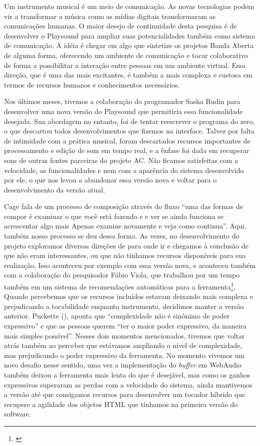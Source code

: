 Um instrumento musical é um meio de comunicação. As novas tecnologias podem vir a transformar a música como as mídias digitais transformaram as comunicações humanas. O maior desejo de continuidade desta pesquisa é de desenvolver o Playsound para ampliar suas potencialidades também como sistema de comunicação. A idéia é chegar em algo que sintetize os projetos Banda Aberta de alguma forma, oferecendo um ambiente de comunicação e tocar colaborativo de forma a possibilitar a interação entre pessoas em um ambiente virtual. Essa direção, que é uma das mais excitantes, é também a mais complexa e custosa em termos de recursos humanos e conhecimentos necessários.

Nos últimos meses, tivemos a colaboração do programador Sasha Rudin para desenvolver uma nova versão do Playsound que permitiria essa funcionalidade desejada. Sua abordagem no entanto, foi de tentar reescrever o programa do zero, o que descartou todos desenvolvimentos que fizemos na interface. Talvez por falta de intimidade com a prática musical, foram descartados recursos importantes de processamento e edição de som em tempo real, e a ênfase foi dada em recuperar sons de outras fontes parceiras do projeto AC. Não ficamos satisfeitas com a velocidade, as funcionalidades e nem com a aparência do sistema desenvolvido por ele, o que nos levou a abandonar essa versão nova e voltar para o desenvolvimento da versão atual. 

Cage fala de um processo de composição através do fluxo ``uma das formas de compor é examinar o que você está fazendo e e ver se ainda funciona se acrescentar algo mais Apenas examine novamente e veja como continua''\cite{Cage2015}. Aqui, também nosso processo se deu dessa forma. As vezes, no desenvolvimento do projeto exploramos diversas direções de para onde ir e chegamos à conclusão de que não eram interessantes, ou que não tínhamos recursos disponíveis para sua realização. Isso aconteceu por exemplo com essa versão nova, e aconteceu também com a colaboração do pesquisador Fábio Viola, que trabalhou por um tempo também em um sistema de recomendações automáticas para a ferramenta\footnote{\cite{Viola2018}}. Quando percebemos que os recursos incluídos estavam deixando mais complexa e prejudicando a tocabilidade enquanto instrumento, decidimos manter a versão anterior. Puckette (\citeyear{PucketteMiller}), aponta que ``complexidade não é sinônimo de poder expressivo'' e que as pessoas querem ``ter o maior poder expressivo, da maneira mais simples possível''. Nesses dois momentos mencionados, tivemos que voltar atrás também ao perceber que estávamos ampliando o nível de complexidade, mas prejudicando o poder expressivo da ferramenta. No momento vivemos um novo desafio nesse sentido, uma vez a implementação do \emph{buffer} em WebAudio também deixou a ferramenta mais lenta do que é desejável, mas como os ganhos expressivos superaram as perdas com a velocidade do sistema, ainda mantivemos a versão até que consigamos recursos para desenvolver um tocador híbrido que recupere a agilidade dos objetos HTML que tínhamos na primeira versão do software.

